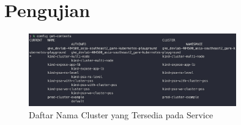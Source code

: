 \chapter{Pengujian}

\begin{figure}[ht]
  \centering
  \includegraphics[width=0.8\textwidth]{resources/chapter-4/pengujian/p00.jpg}
  \caption{Daftar Nama Cluster yang Tersedia pada Service}
  \label{fig:list-cluster-tersedia}
\end{figure}


